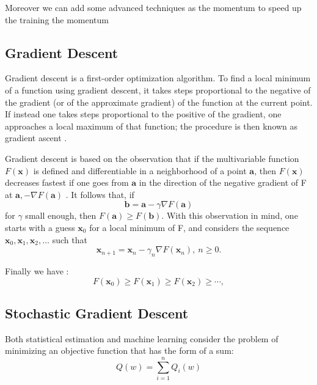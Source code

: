Moreover we can add some advanced techniques as the momentum to speed up the training the momentum 


\subsection{Gradient Descent}
Gradient descent is a first-order optimization algorithm. To find a local minimum of a function using gradient descent, it takes steps proportional to the negative of the gradient (or of the approximate gradient) of the function at the current point. If instead one takes steps proportional to the positive of the gradient, one approaches a local maximum of that function; the procedure is then known as gradient ascent \cite{Kiwiel2001,Qian1999}.

Gradient descent is based on the observation that if the multivariable function $F(\mathbf{x})$ is defined and differentiable in a neighborhood of a point $\mathbf{a}$, then $F(\mathbf{x})$ decreases fastest if one goes from $\mathbf{a}$ in the direction of the negative gradient of F at $\mathbf{a}, -\nabla F(\mathbf{a})$ \cite{Yuan1999}. It follows that, if
\begin{equation}
\mathbf{b} = \mathbf{a}-\gamma\nabla F(\mathbf{a})
\end{equation}
for $\gamma$ small enough, then $F(\mathbf{a})\geq F(\mathbf{b})$. With this observation in mind, one starts with a guess $\mathbf{x}_0$ for a local minimum of F, and considers the sequence $\mathbf{x}_0, \mathbf{x}_1, \mathbf{x}_2, \dots$ such that
\begin{equation}
\mathbf{x}_{n+1}=\mathbf{x}_n-\gamma_n \nabla F(\mathbf{x}_n),\ n \ge 0.
\end{equation}

Finally we have \cite{Cauchy1847}:
\begin{equation}
F(\mathbf{x}_0)\ge F(\mathbf{x}_1)\ge F(\mathbf{x}_2)\ge \cdots,
\end{equation}


\subsection{Stochastic Gradient Descent}

Both statistical estimation and machine learning consider the problem of minimizing an objective function that has the form of a sum:
\begin{equation}
Q(w) = \sum_{i=1}^n Q_i(w)
\end{equation}

